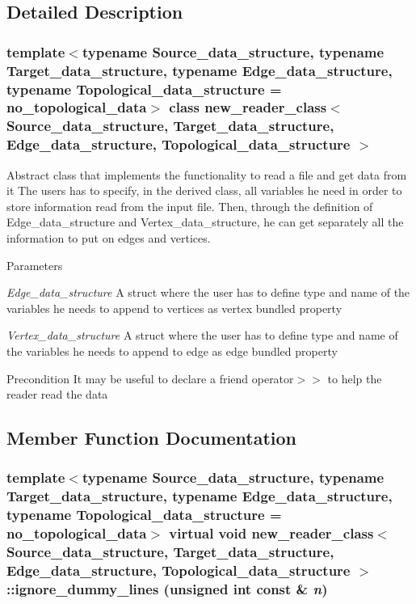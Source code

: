 \subsection{Detailed Description}
\subsubsection*{template$<$typename Source\_\-data\_\-structure, typename Target\_\-data\_\-structure, typename Edge\_\-data\_\-structure, typename Topological\_\-data\_\-structure = no\_\-topological\_\-data$>$ class new\_\-reader\_\-class$<$ Source\_\-data\_\-structure, Target\_\-data\_\-structure, Edge\_\-data\_\-structure, Topological\_\-data\_\-structure $>$}

Abstract class that implements the functionality to read a file and get data from it  The users has to specify, in the derived class, all variables he need in order to store information read from the input file. Then, through the definition of Edge\_\-data\_\-structure and Vertex\_\-data\_\-structure, he can get separately all the information to put on edges and vertices. 
\begin{DoxyParams}{Parameters}
\item[{\em Edge\_\-data\_\-structure}]A struct where the user has to define type and name of the variables he needs to append to vertices as vertex bundled property \item[{\em Vertex\_\-data\_\-structure}]A struct where the user has to define type and name of the variables he needs to append to edge as edge bundled property \end{DoxyParams}
\begin{DoxyPrecond}{Precondition}
It may be useful to declare a friend operator$>$$>$ to help the reader read the data 
\end{DoxyPrecond}


\subsection{Member Function Documentation}
\hypertarget{classnew__reader__class_ae1d2a3f3688c63248728cdee111ff021}{
\subsubsection[{ignore\_\-dummy\_\-lines}]{\setlength{\rightskip}{0pt plus 5cm}template$<$typename Source\_\-data\_\-structure, typename Target\_\-data\_\-structure, typename Edge\_\-data\_\-structure, typename Topological\_\-data\_\-structure = no\_\-topological\_\-data$>$ virtual void {\bf new\_\-reader\_\-class}$<$ Source\_\-data\_\-structure, Target\_\-data\_\-structure, Edge\_\-data\_\-structure, Topological\_\-data\_\-structure $>$::ignore\_\-dummy\_\-lines (unsigned int const \& {\em n})}}
\label{classnew__reader__class_ae1d2a3f3688c63248728cdee111ff021}


